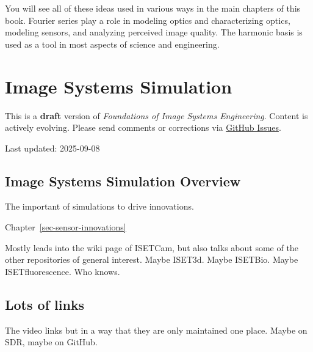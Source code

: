 \documentclass[
  letterpaper,
]{book}
\begin{document}
You will see all of these ideas used in various ways in the main
chapters of this book. Fourier series play a role in modeling optics and
characterizing optics, modeling sensors, and analyzing perceived image
quality. The harmonic basis is used as a tool in most aspects of science
and engineering.

\chapter{Image Systems Simulation}\label{sec-isetcam}

\begin{tcolorbox}[enhanced jigsaw, opacityback=0, breakable, coltitle=black, leftrule=.75mm, left=2mm, colframe=quarto-callout-warning-color-frame, opacitybacktitle=0.6, bottomtitle=1mm, bottomrule=.15mm, toprule=.15mm, title=\textcolor{quarto-callout-warning-color}{\faExclamationTriangle}\hspace{0.5em}{Work in Progress}, titlerule=0mm, toptitle=1mm, colback=white, rightrule=.15mm, colbacktitle=quarto-callout-warning-color!10!white, arc=.35mm]

This is a \textbf{draft} version of \emph{Foundations of Image Systems
Engineering}. Content is actively evolving. Please send comments or
corrections via \href{https://github.com/wandell/FISE-git/issues}{GitHub
Issues}.

Last updated: 2025-09-08

\end{tcolorbox}

\section{Image Systems Simulation Overview}\label{sec-isetcam-overview}

The important of simulations to drive innovations.

Chapter~\ref{sec-sensor-innovations}

Mostly leads into the wiki page of ISETCam, but also talks about some of
the other repositories of general interest. Maybe ISET3d. Maybe ISETBio.
Maybe ISETfluorescence. Who knows.

\section{Lots of links}\label{lots-of-links}

The video links but in a way that they are only maintained one place.
Maybe on SDR, maybe on GitHub.
\end{document}
